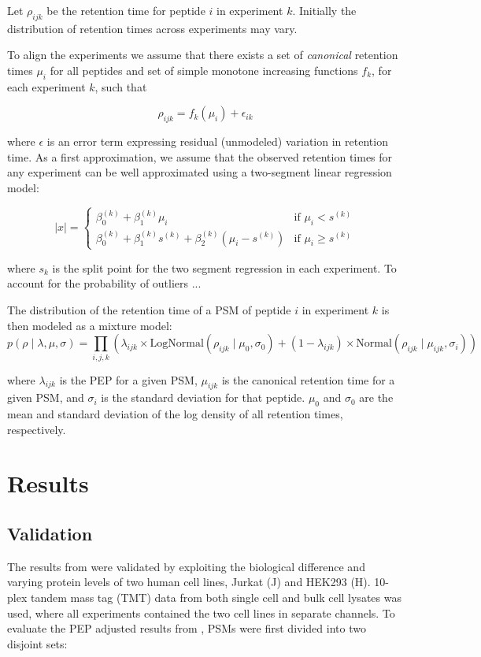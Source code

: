 \begin{spacing}{1.55}
Let $\rho_{ijk}$ be the retention time for peptide $i$ in experiment $k$.  Initially the distribution of retention times across experiments may vary.

To align the experiments we assume that there exists a set of \emph{canonical} retention times $\mu_i$ for all peptides and set of simple monotone increasing functions $f_k$, for each experiment $k$, such that

$$\rho_{ijk} = f_k(\mu_i) + \epsilon_{ik}$$

where $\epsilon$ is an error term expressing residual (unmodeled) variation in retention time.  As a first approximation, we assume that the observed retention times for any experiment can be well approximated using a two-segment linear regression model: 

\[ \lvert x\rvert = \begin{cases}
	\beta_0^{(k)} + \beta_1^{(k)}\mu_i & \text{if }  \mu_i < s^{(k)}  \\
	\beta_0^{(k)} + \beta_1^{(k)}s^{(k)} + \beta_2^{(k)}(\mu_i - s^{(k)}) & \text{if } \mu_i \ge s^{(k)}
                 \end{cases} \]

where $s_k$ is the split point for the two segment regression in each experiment.  To account for the probability of outliers ...

The distribution of the retention time of a PSM of peptide $i$ in experiment $k$ is then modeled as a mixture model:
\[ p(\rho\;\vert\;\lambda,\mu,\sigma) =  \prod_{i,j,k}^{} ( \lambda_{ijk} \times \text{LogNormal}(\rho_{ijk}\;\vert\;\mu_{0},\sigma_{0})  + (1-\lambda_{ijk}) \times \text{Normal}(\rho_{ijk}\;\vert\;\mu_{ijk},\sigma_{i}) ) \]

where $\lambda_{ijk}$ is the PEP for a given PSM, $\mu_{ijk}$ is the canonical retention time for a given PSM, and $\sigma_{i}$ is the standard deviation for that peptide. $\mu_{0}$ and $\sigma_{0}$ are the mean and standard deviation of the log density of all retention times, respectively.

\section{Results}

\subsection{Validation}

The results from \methodname\; were validated by exploiting the biological difference and varying protein levels of two human cell lines, Jurkat (J) and HEK293 (H). 10-plex tandem mass tag (TMT) data from both single cell and bulk cell lysates was used, where all experiments contained the two cell lines in separate channels. To evaluate the PEP adjusted results from \methodname, PSMs were first divided into two disjoint sets:


\end{spacing}
